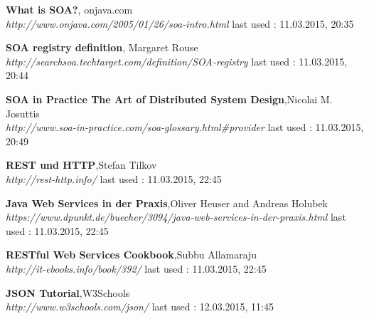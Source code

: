 \documentclass[12pt]{article}
\begin{document}
\begin{thebibliography}{56}
   	  
     	     	     	 
   \textbf{What is SOA?}, onjava.com \\
  \textit{http://www.onjava.com/2005/01/26/soa-intro.html}
  \newline last used : 11.03.2015, 20:35
 	 
 	 
   \textbf{SOA registry definition}, Margaret Rouse\\
  \textit{http://searchsoa.techtarget.com/definition/SOA-registry}
  \newline last used : 11.03.2015, 20:44 	 
   	     	   
   \textbf{SOA in Practice
The Art of Distributed System Design},Nicolai M. Josuttis\\
  \textit{http://www.soa-in-practice.com/soa-glossary.html\#provider}
  \newline last used : 11.03.2015, 20:49 

  \textbf{REST und HTTP},Stefan Tilkov\\
  \textit{http://rest-http.info/}
  \newline last used : 11.03.2015, 22:45 

  \textbf{Java Web Services in der Praxis},Oliver Heuser and Andreas Holubek\\
  \textit{https://www.dpunkt.de/buecher/3094/java-web-services-in-der-praxis.html}
  \newline last used : 11.03.2015, 22:45

  \textbf{RESTful Web Services Cookbook},Subbu Allamaraju\\
  \textit{http://it-ebooks.info/book/392/}
  \newline last used : 11.03.2015, 22:45

  \textbf{JSON Tutorial},W3Schools\\
  \textit{http://www.w3schools.com/json/}
  \newline last used : 12.03.2015, 11:45


 	 
 	 
\end{thebibliography}
\end{document}
